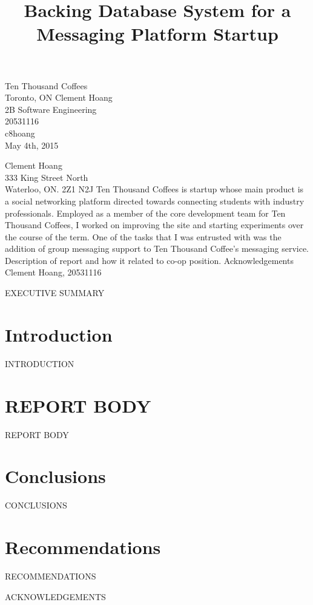 \documentclass[12pt]{article}
\begin{document}
\title{Backing Database System for a Messaging Platform Startup}
{
	Ten Thousand Coffees\\
	Toronto, ON
}
{
	Clement Hoang\\
	2B Software Engineering\\
	20531116\\
	c8hoang\\
	May 4th, 2015
}


{
	\noindent
	Clement Hoang\\
	333 King Street North\\
	Waterloo, ON. 2Z1 N2J
}
{
	Ten Thousand Coffees is startup whose main product is a social networking platform directed towards connecting students with
	industry professionals. Employed as a member of the core development team for Ten Thousand Coffees, I worked on improving the site
	and starting experiments over the course of the term. One of the tasks that I was entrusted with was the addition of group messaging
	support to Ten Thousand Coffee's messaging service.
}
{
	Description of report and how it related to co-op position.
}
{
	Acknowledgements
}
{
	Clement Hoang, 20531116
}


EXECUTIVE SUMMARY
\newpage


\toc


\section{Introduction}
INTRODUCTION


\section{REPORT BODY}
REPORT BODY


\section{Conclusions}
CONCLUSIONS


\section{Recommendations}
RECOMMENDATIONS


\newpage



\newpage


ACKNOWLEDGEMENTS
\newpage


\end{document}
